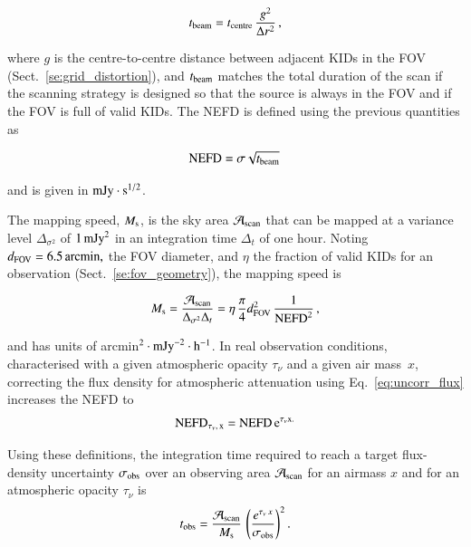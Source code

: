 \documentclass[traditionalabstract]{aa}
\newcommand{\taunu}{\tau_{\nu}}
\newcommand{\airmass}{air mass}
\begin{document}
{\begin{equation}
  t_{\rm{beam}} = t_{\rm{centre}}\, \frac{g^2}{\Delta r^2}\,,
\label{eq:t_det}
\end{equation}

where $g$ is the centre-to-centre distance between adjacent KIDs in the FOV
(Sect.~\ref{se:grid_distortion}), and $t_{\rm{beam}}$ matches the total duration of
the scan if the scanning strategy is designed so that the source is always in
the FOV and if the FOV is full of valid KIDs. The NEFD is defined
using the previous quantities as 

\begin{equation}
  \rm{NEFD} = \sigma \sqrt{t_{\rm{beam}}}\, 
\label{eq:nefd_def}
\end{equation}

and is given in $\rm{mJy}\cdot s^{1/2}$.

The mapping speed, $M_{\rm{s}}$, is the sky area $\mathcal{A}_{\rm{scan}}$ that
can be mapped at a variance level $\Delta_{\sigma^2}$ of $1\,\rm{mJy}^2$ in an
integration time $\Delta_t$ of one hour. Noting $d_{\rm{FOV}} =
6.5\,\rm{arcmin,}$ the FOV diameter, and $\eta$ the fraction of valid KIDs for an
observation (Sect.~\ref{se:fov_geometry}), the mapping speed is

\begin{equation}
M_{\rm{s}} = \frac{\mathcal{A}_{\rm{scan}}}{\Delta_{\sigma^2}\Delta_t} = 
\eta \, \frac{\pi}{4} d_{\rm{FOV}}^2 \, \frac{1}{\rm{NEFD}^2}\, ,
\label{eq:mapping_speed}
\end{equation}

and has units of arcmin$^2 \cdot \rm{mJy}^{-2} \cdot \rm{h}^{-1}$. 
In real observation conditions, characterised with a given atmospheric
opacity $\taunu$ and a given \airmass\ $x$, correcting the flux
density for atmospheric attenuation using Eq.~\ref{eq:uncorr_flux}   
increases the NEFD to 
\begin{equation}
\rm{NEFD}_{\taunu,\, x} = \rm{NEFD}\, e^{\taunu x.}
\label{eq:nefd_tau_el}
\end{equation}

Using these definitions, the integration time required to reach a target flux-density uncertainty $\sigma_{\rm{obs}}$ over an observing area
$\mathcal{A}_{\rm{scan}}$ for an airmass $x$ and for an atmospheric opacity $\taunu$ is
\begin{equation}
  t_{\rm{obs}} = \frac{\mathcal{A}_{\rm{scan}}}{ M_{\rm{s}}} \, \left(\frac{e^{\taunu\, x}}{\sigma_{\rm{obs}}}\right)^2.
\end{equation}

}
\end{document}
